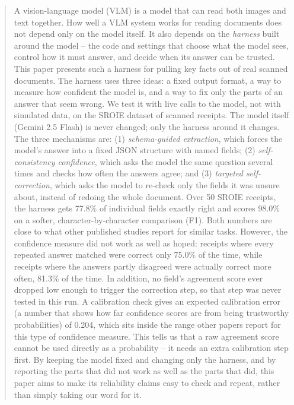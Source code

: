 \documentclass[conference]{IEEEtran}
\begin{document}
\begin{abstract}
A vision-language model (VLM) is a model that can read both images and text together. How well a VLM system works for reading documents does not depend only on the model itself. It also depends on the \emph{harness} built around the model -- the code and settings that choose what the model sees, control how it must answer, and decide when its answer can be trusted. This paper presents such a harness for pulling key facts out of real scanned documents. The harness uses three ideas: a fixed output format, a way to measure how confident the model is, and a way to fix only the parts of an answer that seem wrong. We test it with live calls to the model, not with simulated data, on the SROIE dataset of scanned receipts. The model itself (Gemini 2.5 Flash) is never changed; only the harness around it changes. The three mechanisms are: (1) \emph{schema-guided extraction}, which forces the model's answer into a fixed JSON structure with named fields; (2) \emph{self-consistency confidence}, which asks the model the same question several times and checks how often the answers agree; and (3) \emph{targeted self-correction}, which asks the model to re-check only the fields it was unsure about, instead of redoing the whole document. Over 50 SROIE receipts, the harness gets 77.8\% of individual fields exactly right and scores 98.0\% on a softer, character-by-character comparison (F1). Both numbers are close to what other published studies report for similar tasks. However, the confidence measure did not work as well as hoped: receipts where every repeated answer matched were correct only 75.0\% of the time, while receipts where the answers partly disagreed were actually correct more often, 81.3\% of the time. In addition, no field's agreement score ever dropped low enough to trigger the correction step, so that step was never tested in this run. A calibration check gives an expected calibration error (a number that shows how far confidence scores are from being trustworthy probabilities) of 0.204, which sits inside the range other papers report for this type of confidence measure. This tells us that a raw agreement score cannot be used directly as a probability -- it needs an extra calibration step first. By keeping the model fixed and changing only the harness, and by reporting the parts that did not work as well as the parts that did, this paper aims to make its reliability claims easy to check and repeat, rather than simply taking our word for it.
\end{abstract}
\end{document}
